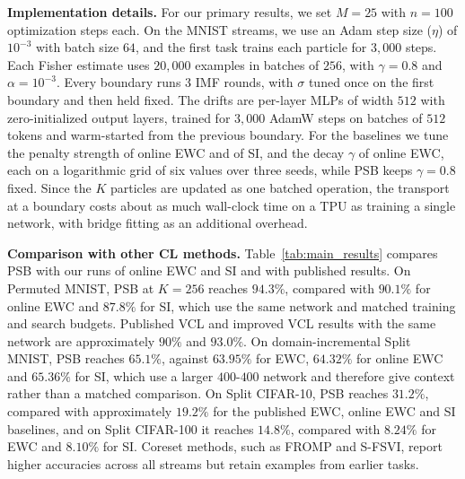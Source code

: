 \documentclass{article}
\begin{document}
\textbf{Implementation details.} For our primary results, we set $M=25$ with
$n=100$ optimization steps each. On the
MNIST streams, we use an Adam step size ($\eta$) of $10^{-3}$ with batch size $64$, and the first task trains each particle for $3{,}000$ steps. Each Fisher estimate uses $20{,}000$ examples in batches of $256$, with $\gamma=0.8$ and $\alpha=10^{-3}$. Every boundary runs 3 IMF rounds, with $\sigma$ tuned once on the first boundary and then held fixed. The drifts are per-layer MLPs of width $512$ with zero-initialized output layers, trained for $3{,}000$ AdamW
steps on batches of $512$ tokens and warm-started from the previous boundary.
For the baselines we tune the penalty strength of online EWC and of SI, and
the decay $\gamma$ of online EWC, each on a logarithmic grid of six values over
three seeds, while PSB keeps $\gamma=0.8$ fixed.
Since the $K$ particles are updated as one batched operation, the transport at a
boundary costs about as much wall-clock time on a TPU as training a single
network, with bridge fitting as an additional overhead.

\textbf{Comparison with other CL methods.} Table~\ref{tab:main_results}
compares PSB with our runs of online EWC and SI and with published results. On
Permuted MNIST, PSB at $K=256$ reaches $94.3\%$, compared with $90.1\%$ for
online EWC and $87.8\%$ for SI, which use the same network and matched training
and search budgets. Published VCL and improved VCL results with the same network are approximately $90\%$ and $93.0\%$. On domain-incremental Split MNIST, PSB reaches
$65.1\%$, against $63.95\%$ for EWC, $64.32\%$ for online EWC and $65.36\%$ for
SI, which use a larger $400$-$400$ network and therefore give context rather
than a matched comparison. On Split CIFAR-10, PSB reaches $31.2\%$, compared
with approximately $19.2\%$ for the published EWC, online EWC and SI baselines, and on Split CIFAR-100 it reaches $14.8\%$, compared with $8.24\%$ for EWC and $8.10\%$ for SI. Coreset methods, such as FROMP and S-FSVI, report higher accuracies across all streams but retain examples from earlier tasks.
\end{document}
